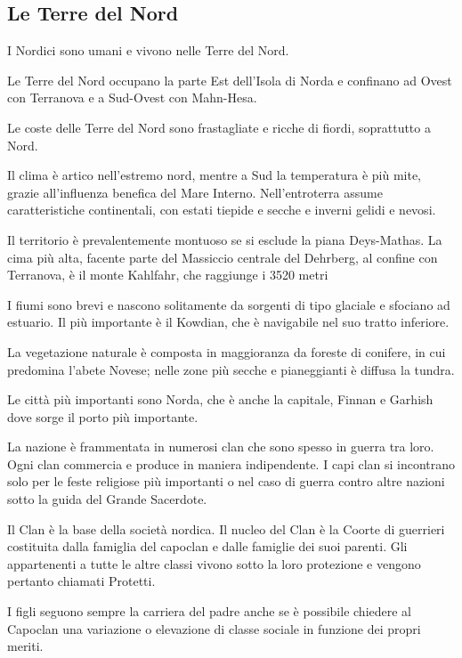 

\subsection{Le Terre del Nord}


I Nordici sono umani e vivono nelle Terre del Nord.

\Geografia Le Terre del Nord occupano la parte Est dell'Isola di Norda
e confinano ad Ovest con Terranova e a Sud-Ovest con Mahn-Hesa.

Le coste delle Terre del Nord sono frastagliate e ricche di fiordi,
soprattutto a Nord.

Il clima \`e artico nell'estremo nord, mentre a Sud la temperatura \`e
pi\`u mite, grazie all'influenza benefica del Mare Interno.
Nell'entroterra assume caratteristiche continentali, con estati
tiepide e secche e inverni gelidi e nevosi. 

Il territorio \`e prevalentemente montuoso se si esclude la piana
Deys-Mathas. La cima pi\`u alta, facente parte del Massiccio centrale
del Dehrberg, al confine con Terranova, \`e il monte Kahlfahr, che
raggiunge i 3520 metri

I fiumi sono brevi e nascono solitamente da sorgenti di tipo glaciale
e sfociano ad estuario. Il pi\`u importante \`e il Kowdian, che \`e
navigabile nel suo tratto inferiore.

La vegetazione naturale \`e composta in maggioranza da foreste di
conifere, in cui predomina l'abete Novese; nelle zone pi\`u secche e
pianeggianti \`e diffusa la tundra.

Le citt\`a pi\`u importanti sono Norda, che \`e anche la capitale,
Finnan e Garhish dove sorge il porto pi\`u importante.

\Politica La nazione \`e frammentata in numerosi clan che sono spesso
in guerra tra loro. Ogni clan commercia e produce in maniera
indipendente. I capi clan si incontrano solo per le feste religiose
pi\`u importanti o nel caso di guerra contro altre nazioni sotto la
guida del Grande Sacerdote.

Il Clan \`e la base della societ\`a nordica. Il nucleo del Clan
\`e la Coorte di guerrieri costituita dalla famiglia del capoclan e
dalle famiglie dei suoi parenti. Gli appartenenti a tutte le altre
classi vivono sotto la loro protezione e vengono pertanto chiamati
Protetti.

I figli seguono sempre la carriera del padre anche se \`e possibile
chiedere al Capoclan una variazione o elevazione di classe sociale in
funzione dei propri meriti.

